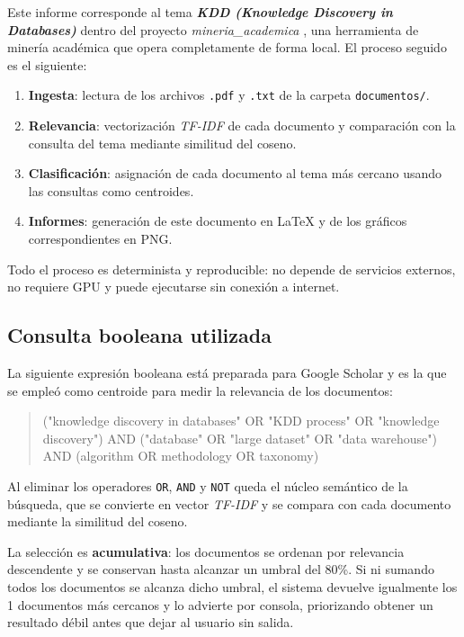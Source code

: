 \documentclass[11pt,a4paper]{article}
\newcommand{\tema}[1]{\textbf{\textit{#1}}}
\newcommand{\pcento}{\%}
\begin{document}
Este informe corresponde al tema \tema{ KDD (Knowledge Discovery in Databases) } dentro del
proyecto \textit{ mineria\_academica }, una herramienta de minería académica que
opera completamente de forma local. El proceso seguido es el siguiente:

\begin{enumerate}
  \item \textbf{Ingesta}: lectura de los archivos \texttt{.pdf} y
        \texttt{.txt} de la carpeta \texttt{documentos/}.
  \item \textbf{Relevancia}: vectorización \textit{TF-IDF} de cada documento
        y comparación con la consulta del tema mediante similitud del coseno.
  \item \textbf{Clasificación}: asignación de cada documento al tema más
        cercano usando las consultas como centroides.
  \item \textbf{Informes}: generación de este documento en \LaTeX{} y de los
        gráficos correspondientes en PNG.
\end{enumerate}

Todo el proceso es determinista y reproducible: no depende de servicios
externos, no requiere GPU y puede ejecutarse sin conexión a internet.

\subsection{Consulta booleana utilizada}
\label{sec:query}

La siguiente expresión booleana está preparada para Google Scholar y es la que
se empleó como centroide para medir la relevancia de los documentos:

\begin{quote}
\small\ttfamily
("knowledge discovery in databases" OR "KDD process" OR "knowledge discovery") AND ("database" OR "large dataset" OR "data warehouse") AND (algorithm OR methodology OR taxonomy)
\end{quote}

Al eliminar los operadores \texttt{OR}, \texttt{AND} y \texttt{NOT} queda el
núcleo semántico de la búsqueda, que se convierte en vector \textit{TF-IDF} y
se compara con cada documento mediante la similitud del coseno.

La selección es \textbf{acumulativa}: los documentos se ordenan por relevancia
descendente y se conservan hasta alcanzar un umbral del
80\pcento. Si ni sumando todos los documentos se alcanza
dicho umbral, el sistema devuelve igualmente los 1
documentos más cercanos y lo advierte por consola, priorizando obtener un
resultado débil antes que dejar al usuario sin salida.
\end{document}
